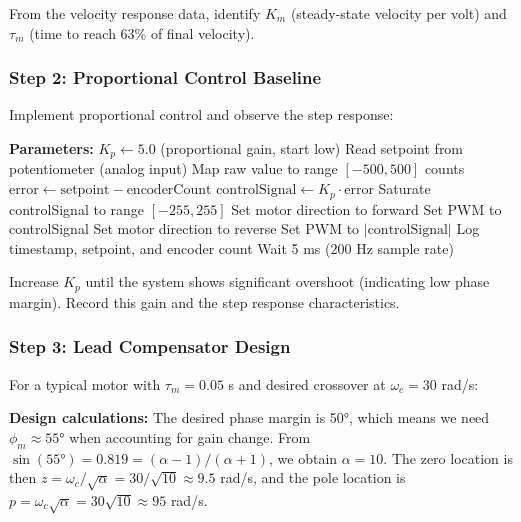 From the velocity response data, identify $K_m$ (steady-state velocity per volt) and $\tau_m$ (time to reach 63\% of final velocity).

\subsubsection{Step 2: Proportional Control Baseline}

Implement proportional control and observe the step response:

\begin{algorithm}
\caption{Proportional Position Control Baseline}
\begin{algorithmic}[1]
\State \textbf{Parameters:} $K_p \gets 5.0$ (proportional gain, start low)
\State
\Loop
    \State Read setpoint from potentiometer (analog input)
    \State Map raw value to range $[-500, 500]$ counts
    \State $\text{error} \gets \text{setpoint} - \text{encoderCount}$
    \State $\text{controlSignal} \gets K_p \cdot \text{error}$
    \State Saturate controlSignal to range $[-255, 255]$
    \State
        \State Set motor direction to forward
        \State Set PWM to controlSignal
    \Else
        \State Set motor direction to reverse
        \State Set PWM to $|\text{controlSignal}|$
    \EndIf
    \State
    \State Log timestamp, setpoint, and encoder count
    \State Wait 5 ms (200 Hz sample rate)
\EndLoop
\end{algorithmic}
\end{algorithm}

Increase $K_p$ until the system shows significant overshoot (indicating low phase margin). Record this gain and the step response characteristics.

\subsubsection{Step 3: Lead Compensator Design}

For a typical motor with $\tau_m = 0.05$ s and desired crossover at $\omega_c = 30$ rad/s:

\textbf{Design calculations:} The desired phase margin is 50°, which means we need $\phi_m \approx 55°$ when accounting for gain change. From $\sin(55°) = 0.819 = (\alpha-1)/(\alpha+1)$, we obtain $\alpha = 10$. The zero location is then $z = \omega_c/\sqrt{\alpha} = 30/\sqrt{10} \approx 9.5$ rad/s, and the pole location is $p = \omega_c \sqrt{\alpha} = 30\sqrt{10} \approx 95$ rad/s.

